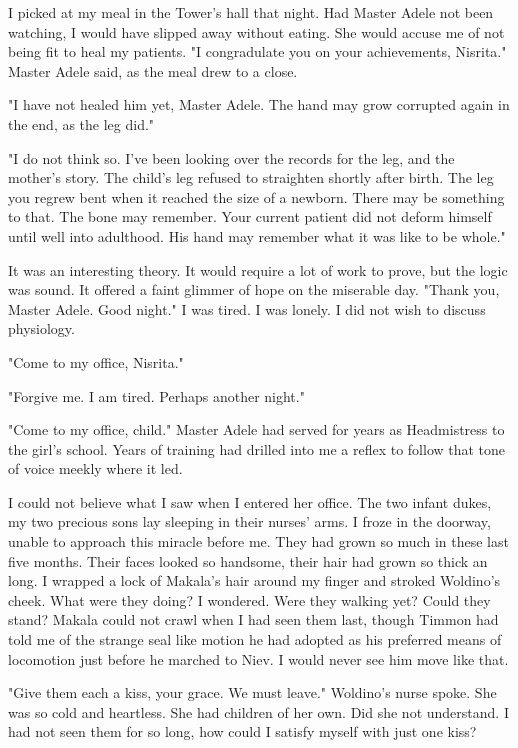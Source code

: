 \documentclass{article}
\begin{document}
I picked at my meal in the Tower's hall that night. Had Master Adele not been watching, I would have slipped away without eating. She would accuse me of not being fit to heal my patients. "I congradulate you on your achievements, Nisrita." Master Adele said, as the meal drew to a close. 

"I have not healed him yet, Master Adele. The hand may grow corrupted again in the end, as the leg did."

"I do not think so. I've been looking over the records for the leg, and the mother's story. The child's leg refused to straighten shortly after birth. The leg you regrew bent when it reached the size of a newborn. There may be something to that. The bone may remember. Your current patient did not deform himself until well into adulthood. His hand may remember what it was like to be whole."

It was an interesting theory. It would require a lot of work to prove, but the logic was sound. It offered a faint glimmer of hope on the miserable day. "Thank you, Master Adele. Good night." I was tired. I was lonely. I did not wish to discuss physiology.

"Come to my office, Nisrita."

"Forgive me. I am tired. Perhaps another night."

"Come to my office, child." Master Adele had served for years as Headmistress to the girl's school. Years of training had drilled into me a reflex to follow that tone of voice meekly where it led. 

I could not believe what I saw when I entered her office. The two infant dukes, my two precious sons lay sleeping in their nurses' arms. I froze in the doorway, unable to approach this miracle before me. They had grown so much in these last five months. Their faces looked so handsome, their hair had grown so thick an long. I wrapped a lock of Makala's hair around my finger and stroked Woldino's cheek. What were they doing? I wondered. Were they walking yet? Could they stand? Makala could not crawl when I had seen them last, though Timmon had told me of the strange seal like motion he had adopted as his preferred means of locomotion just before he marched to Niev. I would never see him move like that.

"Give them each a kiss, your grace. We must leave." Woldino's nurse spoke. She was so cold and heartless. She had children of her own. Did she not understand. I had not seen them for so long, how could I satisfy myself with just one kiss?
\end{document}
